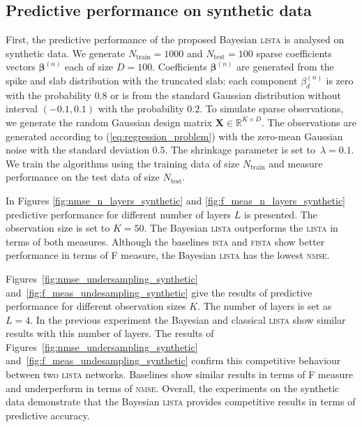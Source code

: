 \documentclass{article}
\begin{document}
\subsection{Predictive performance on synthetic data}
First, the predictive performance of the proposed Bayesian \textsc{lista} is analysed on synthetic data. We generate $N_\text{train}=1000$ and $N_{\text{test}} = 100$ sparse coefficients vectors $\boldsymbol\beta^{(n)}$ each of size $D = 100$. Coefficients $\boldsymbol\beta^{(n)}$ are generated from the spike and slab distribution with the truncated slab: each component $\beta^{(n)}_{d}$ is zero with the probability $0.8$ or is from the standard Gaussian distribution without interval $(-0.1, 0.1)$ with the probability $0.2$. To simulate sparse observations, we generate the random Gaussian design matrix $\mathbf{X} \in \mathbb{R}^{K \times D}$.  The observations are generated according to (\ref{eq:regression_problem}) with the zero-mean Gaussian noise with the standard deviation $0.5$. The shrinkage parameter is set to~$\lambda = 0.1$. We train the algorithms using the training data of size $N_\text{train}$ and measure performance on the test data of size $N_{\text{test}}$.

In Figures \ref{fig:nmse_n_layers_synthetic} and \ref{fig:f_meas_n_layers_synthetic} predictive performance for different number of layers $L$ is presented. The observation size is set to $K=50$. The Bayesian \textsc{lista} outperforms the \textsc{lista} in terms of both measures. Although the baselines \textsc{ista} and \textsc{fista} show better performance in terms of F measure, the Bayesian \textsc{lista} has the lowest \textsc{nmse}.

Figures~\ref{fig:nmse_undersampling_synthetic} and~\ref{fig:f_meas_undesampling_synthetic} give the results of predictive performance for different observation sizes $K$. The number of layers is set as $L=4$. In the previous experiment the Bayesian and classical \textsc{lista} show similar results with this number of layers. The results of Figures~\ref{fig:nmse_undersampling_synthetic} and~\ref{fig:f_meas_undesampling_synthetic} confirm this competitive behaviour between two \textsc{lista} networks. Baselines show similar results in terms of F measure and underperform in terms of \textsc{nmse}. Overall, the experiments on the synthetic data demonstrate that the Bayesian \textsc{lista} provides competitive results in terms of predictive accuracy.

\end{document}
